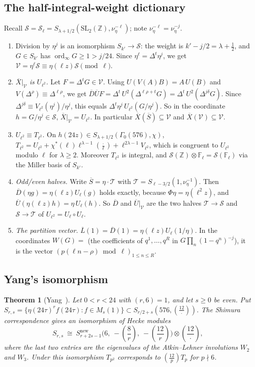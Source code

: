 \documentclass[11pt]{amsart}
\newcommand{\Z}{\mathbb{Z}}
\newcommand{\Fl}{\mathbb{F}_\ell}
\newcommand{\SL}{\mathrm{SL}_2(\Z)}
\newcommand{\Sb}{\overline{S}}
\newcommand{\Ub}{\overline{U}}
\newcommand{\Db}{\overline{D}}
\newcommand{\Xb}{\overline{X}}
\newcommand{\Lb}{\overline{L}}
\newcommand{\cS}{\mathcal{S}}
\newcommand{\cT}{\mathcal{T}}
\newcommand{\cV}{\mathcal{V}}
\newcommand{\leg}[2]{\left(\frac{#1}{#2}\right)}
\DeclareMathOperator{\ord}{ord}
\theoremstyle{plain}
\newtheorem{theorem}{Theorem}[section]
\theoremstyle{definition}
\numberwithin{equation}{section}
\begin{document}
\subsection{The half-integral-weight dictionary}\label{sec:dict}
Recall $\cS=\cS_\ell=S_{\lambda+1/2}(\SL,\nu_\eta^{-\ell})$; note $\nu_\eta^{-\ell}=\nu_\eta^{-j}$.
\begin{enumerate}[label=(D\arabic*)]
\item Division by $\eta^j$ is an isomorphism $S_{k'}\to\cS$: the weight is $k'-j/2=\lambda+\frac12$, and $G\in S_{k'}$ has
  $\ord_\infty G\ge1>j/24$. Since $\eta^\ell=\Delta^t\eta^j$, we get $\cV=\eta^\ell\cS\equiv\eta(\ell z)\cS\pmod\ell$.
\item \emph{$\Xb|_\cV$ is $U_{\ell^2}$.} Let $F=\Delta^tG\in\cV$. Using $U(V(A)B)=A\,U(B)$ and $V(\Delta^\rho)\equiv\Delta^{\ell\rho}$, we get
  $\Db\Ub F=\Delta^t\,U^2(\Delta^{\ell\rho+t}G)=\Delta^t\,U^2(\Delta^{j\delta}G)$. Since
  $\Delta^{j\delta}\equiv V_{\ell^2}(\eta^j)/\eta^j$, this equals $\Delta^t\eta^j\,U_{\ell^2}(G/\eta^j)$. So in the coordinate
  $h=G/\eta^j\in\cS$, $\Xb|_\cV=U_{\ell^2}$. In particular $\Xb(\Sb)\subseteq\cV$ and $\Xb(\cV)\subseteq\cV$.
\item \emph{$U_{\ell^2}\equiv T_{\ell^2}$.} On $h(24z)\in S_{\lambda+1/2}(\Gamma_0(576),\chi)$,
  $T_{\ell^2}=U_{\ell^2}+\chi^*(\ell)\ell^{\lambda-1}\leg{\cdot}{\ell}+\ell^{2\lambda-1}V_{\ell^2}$, which is congruent to $U_{\ell^2}$
  modulo $\ell$ for $\lambda\ge2$. Moreover $T_{\ell^2}$ is integral, and $\cS(\Z)\otimes\Fl=\cS(\Fl)$ via the Miller basis of $S_{k'}$.
\item \emph{Odd/even halves.} Write $\Sb=\eta\cdot\cT$ with $\cT=S_{\ell-3/2}(1,\nu_\eta^{-1})$. Then $\Db(\eta g)=\eta(\ell z)U_\ell(g)$
  holds exactly, because $\Phi\eta=\eta(\ell^2z)$, and $\Ub(\eta(\ell z)h)=\eta\,U_\ell(h)$. So $\Db$ and $\Ub|_\cV$ are the two
  halves $\cT\to\cS$ and $\cS\to\cT$ of $U_{\ell^2}=U_\ell\circ U_\ell$.
\item \emph{The partition vector.} $\Lb(1)=\Db(1)=\eta(\ell z)U_\ell(1/\eta)$. In the coordinates
  $W(G)=$ (the coefficients of $q^1,\dots,q^R$ in $G\prod_n(1-q^n)^{-j}$), it is the vector $(p(\ell n-\rho)\bmod\ell)_{1\le n\le R}$.
\end{enumerate}

\subsection{Yang's isomorphism}
\begin{theorem}[Yang~{\cite[Thm.~1]{Yang2014}}]\label{thm:yang}
Let $0<r<24$ with $(r,6)=1$, and let $s\ge0$ be even. Put $S_{r,s}=\{\eta(24\tau)^rf(24\tau):f\in M_s(1)\}\subset S_{r/2+s}(576,\leg{12}{\cdot})$.
The Shimura correspondence gives an isomorphism of Hecke modules
\[
  S_{r,s}\ \cong\ S^{\mathrm{new}}_{r+2s-1}\big(6,\ -\leg{8}{r},\ -\leg{12}{r}\big)\otimes\leg{12}{\cdot},
\]
where the last two entries are the eigenvalues of the Atkin--Lehner involutions $W_2$ and $W_3$. Under this isomorphism
$T_{p^2}$ corresponds to $\leg{12}{p}T_p$ for $p\nmid6$.
\end{theorem}
\end{document}
